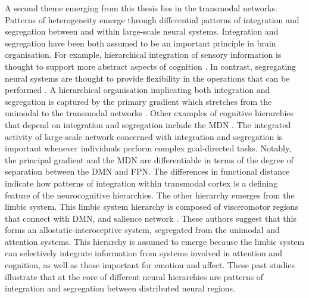 A second theme emerging from this thesis lies in the transmodal networks. Patterns of heterogeneity emerge through differential patterns of integration and segregation between and within large-scale neural systems. Integration and segregation have been both assumed to be an important principle in brain organisation. 
For example, hierarchical integration of sensory information is thought to support more abstract aspects of cognition \cite{Mesulam1998}. In contrast, segregating neural systems are thought to provide flexibility in the operations that can be performed \cite{Buckner2013}. A hierarchical organisation implicating both integration and segregation is captured by the primary gradient which stretches from the unimodal to the transmodal networks \cite{Margulies2016}.
Other examples of cognitive hierarchies that depend on integration and segregation include the MDN \cite{Duncan2010}. The integrated activity of large-scale network concerned with integration and segregation is important whenever individuals perform complex goal-directed tasks.  Notably, the principal gradient and the MDN are differentiable in terms of the degree of separation between the DMN and FPN. The differences in functional distance indicate how patterns of integration within transmodal cortex is a defining feature of the neurocognitive hierarchies. 
The other hierarchy emerges from the limbic system. This limbic system hierarchy is composed of visceromotor regions that connect with DMN, and salience network \cite{Kleckner2017}. These authors suggest that this forms an allostatic-interoceptive system, segregated from the unimodal and attention systems. This hierarchy is assumed to emerge because the limbic system can selectively integrate information from systems involved in attention and cognition, as well as those important for emotion and affect. 
These past studies illustrate that at the core of different neural hierarchies are patterns of integration and segregation between distributed neural regions.

